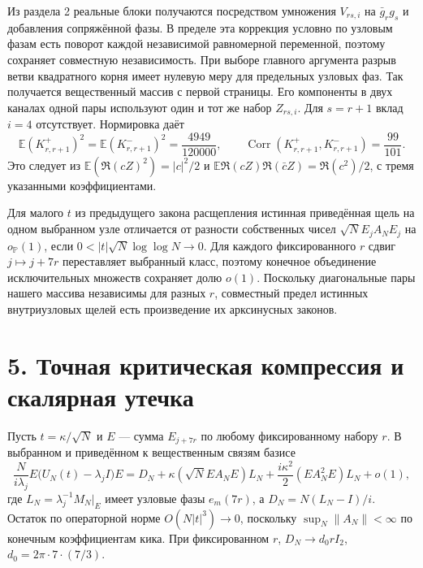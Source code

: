 \documentclass[11pt,a4paper]{article}
\newcommand{\sect}[1]{\section*{\sffamily\color{ink}#1}}
\begin{document}
Из раздела 2 реальные блоки получаются посредством умножения \(V_{rs,i}\) на \(\bar g_r g_s\) и добавления сопряжённой фазы. В пределе эта коррекция условно по узловым фазам есть поворот каждой независимой равномерной переменной, поэтому сохраняет совместную независимость. При выборе главного аргумента разрыв ветви квадратного корня имеет нулевую меру для предельных узловых фаз. Так получается вещественный массив с первой страницы. Его компоненты в двух каналах одной пары используют один и тот же набор \(Z_{rs,i}\). Для \(s=r+1\) вклад \(i=4\) отсутствует. Нормировка даёт
\[
 \mathbb E(K_{r,r+1}^{+})^2=\mathbb E(K_{r,r+1}^{-})^2
       =\frac{4949}{120000},
 \qquad \operatorname{Corr}(K_{r,r+1}^{+},K_{r,r+1}^{-})=\frac{99}{101}.
\]
Это следует из \(\mathbb E(\Re(c Z)^2)=|c|^2/2\) и
\(\mathbb E\Re(c Z)\Re(\bar c Z)=\Re(c^2)/2\), с тремя указанными коэффициентами.

Для малого \(t\) из предыдущего закона расщепления истинная приведённая щель на одном выбранном узле отличается от разности собственных чисел \(\sqrt N E_j A_N E_j\) на \(o_{\mathbb P}(1)\), если \(0<|t|\sqrt N\log\log N\to0\). Для каждого фиксированного \(r\) сдвиг \(j\mapsto j+7r\) переставляет выбранный класс, поэтому конечное объединение исключительных множеств сохраняет долю \(o(1)\). Поскольку диагональные пары нашего массива независимы для разных \(r\), совместный предел истинных внутриузловых щелей есть произведение их арксинусных законов.
\newpage
\sect{5. Точная критическая компрессия и скалярная утечка}
Пусть \(t=\kappa/\sqrt N\) и \(E\) --- сумма \(E_{j+7r}\) по любому фиксированному набору \(r\). В выбранном и приведённом к вещественным связям базисе
\[
   \frac{N}{i\lambda_j} E\bigl(U_N(t)-\lambda_j I\bigr)E
     = D_N+\kappa(\sqrt N EA_NE)L_N
                                +\frac{i\kappa^2}{2}(EA_N^2E)L_N+o(1),
                                                               \tag{4}
\]
где \(L_N=\lambda_j^{-1}M_N|_E\) имеет узловые фазы \(e_m(7r)\), а
\(D_N=N(L_N-I)/i\). Остаток по операторной норме \(O(N|t|^3)\to0\), поскольку \(\sup_N\|A_N\|<\infty\) по конечным коэффициентам кика. При фиксированном \(r\), \(D_N\to d_0 r I_2\), \(d_0=2\pi\cdot7\cdot(7/3)\).
\end{document}
